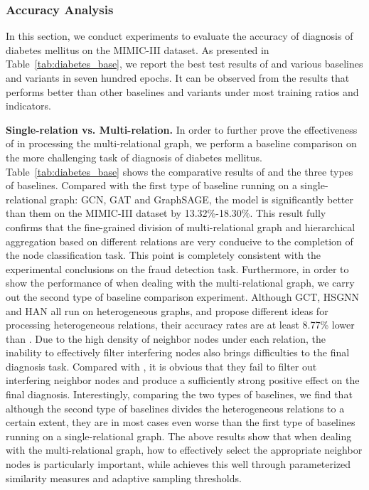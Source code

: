 \subsubsection{Accuracy Analysis}\label{sec:diabetes-accuracy}
In this section, we conduct experiments to evaluate the accuracy of diagnosis of diabetes mellitus on the MIMIC-III dataset.
As presented in Table~\ref{tab:diabetes_base}, we report the best test results of \RioGNN and various baselines and variants in seven hundred epochs.
It can be observed from the results that \RioGNN performs better than other baselines and variants under most training ratios and indicators.



\textbf{Single-relation vs. Multi-relation.}
In order to further prove the effectiveness of \RioGNN in processing the multi-relational graph, we perform a baseline comparison on the more challenging task of diagnosis of diabetes mellitus.
Table~\ref{tab:diabetes_base} shows the comparative results of \RioGNN and the three types of baselines. 
Compared with the first type of baseline running on a single-relational graph: GCN, GAT and GraphSAGE, the model \RioGNN is significantly better than them on the MIMIC-III dataset by 13.32\%-18.30\%.
This result fully confirms that the fine-grained division of multi-relational graph and hierarchical aggregation based on different relations are very conducive to the completion of the node classification task. 
This point is completely consistent with the experimental conclusions on the fraud detection task. 
Furthermore, in order to show the performance of \RioGNN when dealing with the multi-relational graph, we carry out the second type of baseline comparison experiment.
Although GCT, HSGNN and HAN all run on heterogeneous graphs, and propose different ideas for processing heterogeneous relations, their accuracy rates are at least 8.77\% lower than \RioGNN. 
Due to the high density of neighbor nodes under each relation, the inability to effectively filter interfering nodes also brings difficulties to the final diagnosis task. 
Compared with \RioGNN, it is obvious that they fail to filter out interfering neighbor nodes and produce a sufficiently strong positive effect on the final diagnosis. 
Interestingly, comparing the two types of baselines, we find that although the second type of baselines divides the heterogeneous relations to a certain extent, they are in most cases even worse than the first type of baselines running on a single-relational graph. 
The above results show that when dealing with the multi-relational graph, how to effectively select the appropriate neighbor nodes is particularly important, while \RioGNN achieves this well through parameterized similarity measures and adaptive sampling thresholds. 
